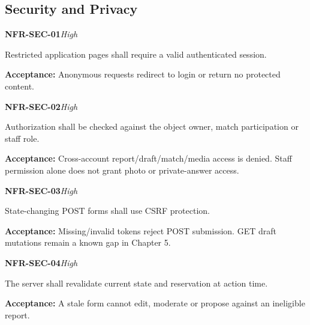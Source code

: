 \documentclass[12pt,a4paper,oneside]{report}
\begin{document}
\subsection{Security and Privacy}

\noindent\begin{minipage}{\linewidth}\textbf{NFR-SEC-01}\hfill\textit{High}\par\nopagebreak

Restricted application pages shall require a valid authenticated session.

{\color{muted}\textbf{Acceptance:} Anonymous requests redirect to login or return no protected content.\par}\end{minipage}\par\vspace{5pt}

\noindent\begin{minipage}{\linewidth}\textbf{NFR-SEC-02}\hfill\textit{High}\par\nopagebreak

Authorization shall be checked against the object owner, match participation or staff role.

{\color{muted}\textbf{Acceptance:} Cross-account report/draft/match/media access is denied. Staff permission alone does not grant photo or private-answer access.\par}\end{minipage}\par\vspace{5pt}

\noindent\begin{minipage}{\linewidth}\textbf{NFR-SEC-03}\hfill\textit{High}\par\nopagebreak

State-changing POST forms shall use CSRF protection.

{\color{muted}\textbf{Acceptance:} Missing/invalid tokens reject POST submission. GET draft mutations remain a known gap in Chapter 5.\par}\end{minipage}\par\vspace{5pt}

\noindent\begin{minipage}{\linewidth}\textbf{NFR-SEC-04}\hfill\textit{High}\par\nopagebreak

The server shall revalidate current state and reservation at action time.

{\color{muted}\textbf{Acceptance:} A stale form cannot edit, moderate or propose against an ineligible report.\par}\end{minipage}\par\vspace{5pt}
\end{document}
